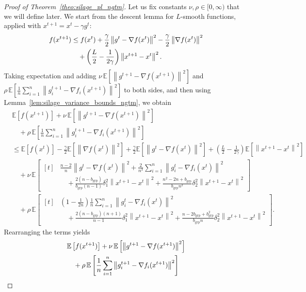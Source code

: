 \documentclass{article}
\newcommand{\bb}{\mathbb}
\newcommand{\sqn}[1]{\left\| #1 \right\|^2}
\newcommand{\Exp}[1]{{\bb E}\left[#1\right]}
\theoremstyle{plain}
\begin{document}
\begin{proof}[Proof of Theorem~\ref{theo:silage_pl_ngtm}]
Let us fix constants $\nu,\rho\in[0,\infty)$ that we will define later.
We start from the descent lemma for $L$-smooth functions, applied with $x^{t+1}=x^t-\gamma g^t$:
\begin{align}
f(x^{t+1})
&\leq f(x^t) + \frac{\gamma}{2}\sqn{g^{t}-\nabla f(x^t)}-\frac{\gamma}{2}\sqn{\nabla f(x^t)} \notag\\
&\quad + \left(\frac{L}{2}-\frac{1}{2\gamma}\right)\sqn{x^{t+1}-x^t}.
\label{eq:descent_pl_silage_ngtm}
\end{align}
Taking expectation and adding $\nu\,\Exp{\sqn{g^{t+1}-\nabla f(x^{t+1})}}$ and
$\rho\,\Exp{\frac{1}{n}\sum_{i=1}^n\sqn{g_i^{t+1}-\nabla f_i(x^{t+1})}}$ to both sides, and then using Lemma~\ref{lem:silage_variance_bounds_ngtm}, we obtain
\begin{align*}
&\Exp{f(x^{t+1})}
+\nu\,\Exp{\sqn{g^{t+1}-\nabla f(x^{t+1})}}\\
&\quad+\rho\,\Exp{\frac{1}{n}\sum_{i=1}^n\sqn{g_i^{t+1}-\nabla f_i(x^{t+1})}}\\
&\leq \Exp{f(x^t)}
-\frac{\gamma}{2}\Exp{\sqn{\nabla f(x^t)}}
+\frac{\gamma}{2}\Exp{\sqn{g^{t}-\nabla f(x^t)}}
+\left(\frac{L}{2}-\frac{1}{2\gamma}\right)\Exp{\sqn{x^{t+1}-x^t}}\\
&\quad+\nu\,\Exp{\begin{aligned}[t]
&\frac{n-2}{n}\sqn{g^t-\nabla f(x^{t})}
+\frac{2}{n^3}\sum_{i=1}^n \sqn{g_i^t-\nabla f_i(x^{t})}\\
&\quad+\frac{2(n-b_{\mathrm{grp}})}{b_{\mathrm{grp}}(n-1)}\delta_1^2\sqn{x^{t+1}-x^t}
+\frac{n^2-2n+b_{\mathrm{grp}}}{b_{\mathrm{grp}}n^2}\delta_2^2\sqn{x^{t+1}-x^t}
\end{aligned}}\\
&\quad+\rho\,\Exp{\begin{aligned}[t]
&\left(1-\frac{1}{2n}\right)\frac{1}{n}\sum_{i=1}^n
\sqn{g_i^t-\nabla f_i(x^{t})}\\
&\quad+\frac{2(n-b_{\mathrm{grp}})(n+1)}{n-1}\delta_1^2\sqn{x^{t+1}-x^t}
+\frac{n-2b_{\mathrm{grp}}+b_{\mathrm{grp}}^2}{b_{\mathrm{grp}}n}\delta_2^2\sqn{x^{t+1}-x^t}
\end{aligned}}.
\end{align*}
Rearranging the terms yields
\begin{align}
&\Exp{f(x^{t+1})}
+\nu\,\Exp{\sqn{g^{t+1}-\nabla f(x^{t+1})}}
\notag\\
&\quad+\rho\,\Exp{\frac{1}{n}\sum_{i=1}^n\sqn{g_i^{t+1}-\nabla f_i(x^{t+1})}}\notag\\

\end{align}
\end{proof}
\end{document}

